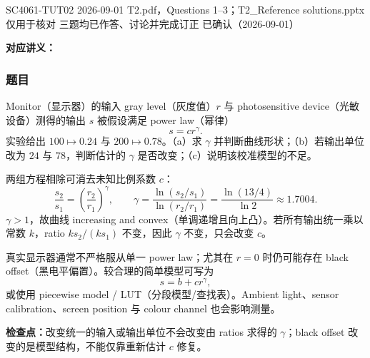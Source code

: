 
\label{tutorial:SC4061-TUT02}

\tutorialmeta
  {SC4061-TUT02}
  {2026-09-01}
  {T2.pdf，Questions 1--3；T2\_Reference solutions.pptx 仅用于核对}
  {三题均已作答、讨论并完成订正}
  {已确认（2026-09-01）}


\textbf{对应讲义：}

\subsubsection*{题目}

Monitor（显示器）的输入 gray level（灰度值）$r$ 与 photosensitive device（光敏设备）测得的输出 $s$ 被假设满足 power law（幂律）
\[
  s=cr^{\gamma}.
\]
实验给出 $100\mapsto0.24$ 与 $200\mapsto0.78$。（a）求 $\gamma$ 并判断曲线形状；（b）若输出单位改为 $24$ 与 $78$，判断估计的 $\gamma$ 是否改变；（c）说明该校准模型的不足。

\begin{checkedsolution}
两组方程相除可消去未知比例系数 $c$：
\[
  \frac{s_2}{s_1}=\left(\frac{r_2}{r_1}\right)^{\gamma},
  \qquad
  \gamma=\frac{\ln(s_2/s_1)}{\ln(r_2/r_1)}
  =\frac{\ln(13/4)}{\ln2}
  \approx\boxed{1.7004}.
\]
$\gamma>1$，故曲线 increasing and convex（单调递增且向上凸）。若所有输出统一乘以常数 $k$，ratio $ks_2/(ks_1)$ 不变，因此 $\gamma$ 不变，只会改变 $c$。

真实显示器通常不严格服从单一 power law；尤其在 $r=0$ 时仍可能存在 black offset（黑电平偏置）。较合理的简单模型可写为
\[
  s=b+cr^{\gamma},
\]
或使用 piecewise model / LUT（分段模型/查找表）。Ambient light、sensor calibration、screen position 与 colour channel 也会影响测量。
\end{checkedsolution}

\textbf{检查点：}改变统一的输入或输出单位不会改变由 ratios 求得的 $\gamma$；black offset 改变的是模型结构，不能仅靠重新估计 $c$ 修复。


